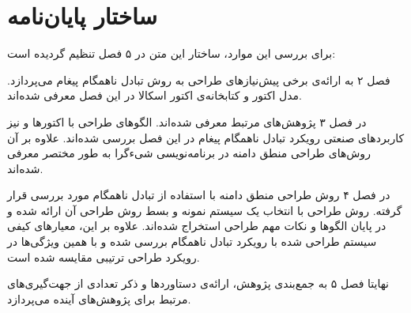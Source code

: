 \section{ساختار پایان‌نامه}
برای بررسی این موارد، ساختار این متن در ۵ فصل تنظیم گردیده است:
\begin{strict_itemize}
\item  فصل ۲ به ارائه‌ی برخی پیش‌نیازهای طراحی به روش تبادل ناهمگام پیغام می‌پردازد. مدل اکتور و کتابخانه‌ی اکتور اسکالا در این فصل معرفی شده‌اند.
\item در فصل ۳ پژوهش‌های مرتبط معرفی شده‌اند. الگوهای طراحی با اکتورها و نیز کاربردهای صنعتی رویکرد تبادل ناهمگام پیغام در این فصل بررسی شده‌اند. علاوه بر آن روش‌های طراحی منطق دامنه در برنامه‌نویسی شیءگرا به طور مختصر معرفی شده‌اند.
\item در فصل ۴ روش طراحی منطق دامنه با استفاده از تبادل ناهمگام مورد بررسی قرار گرفته. روش طراحی با انتخاب یک سیستم نمونه و بسط روش طراحی آن ارائه شده و در پایان الگوها و نکات مهم طراحی استخراج شده‌اند. علاوه بر این، معیارهای کیفی سیستم طراحی شده با رویکرد تبادل ناهمگام بررسی شده و با همین‌ ویژگی‌ها در رویکرد طراحی ترتیبی مقایسه شده است.
\item نهایتا فصل ۵ به جمع‌بندی پژوهش، ارائه‌ی دستاوردها و ذکر تعدادی از جهت‌گیری‌های مرتبط برای پژوهش‌های آینده می‌پردازد.
\end{strict_itemize}

